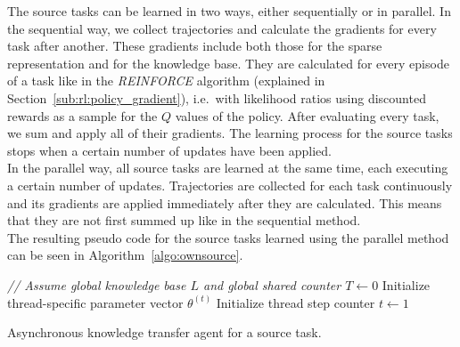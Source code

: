 The source tasks can be learned in two ways, either sequentially or in parallel.
In the sequential way, we collect trajectories and calculate the gradients for every task after another.
These gradients include both those for the sparse representation and for the knowledge base.
They are calculated for every episode of a task like in the \textit{REINFORCE} algorithm (explained in Section~\ref{sub:rl:policy_gradient}), i.e.\ with likelihood ratios using discounted rewards as a sample for the $Q$ values of the policy.
After evaluating every task, we sum and apply all of their gradients.
The learning process for the source tasks stops when a certain number of updates have been applied.\\
In the parallel way, all source tasks are learned at the same time, each executing a certain number of updates.
Trajectories are collected for each task continuously and its gradients are applied immediately after they are calculated.
This means that they are not first summed up like in the sequential method.\\
The resulting pseudo code for the source tasks learned using the parallel method can be seen in Algorithm~\ref{algo:ownsource}.\\
\begin{algorithm}[H]
\DontPrintSemicolon
\emph{// Assume global knowledge base $L$ and global shared counter $T \gets 0$}\;
Initialize thread-specific parameter vector $\theta^{(t)}$\;
Initialize thread step counter $t\gets 1$\;
\caption[Asynchronous knowledge transfer agent for a source task]{Asynchronous knowledge transfer agent for a source task.}
\label{algo:ownsource}
\end{algorithm}

